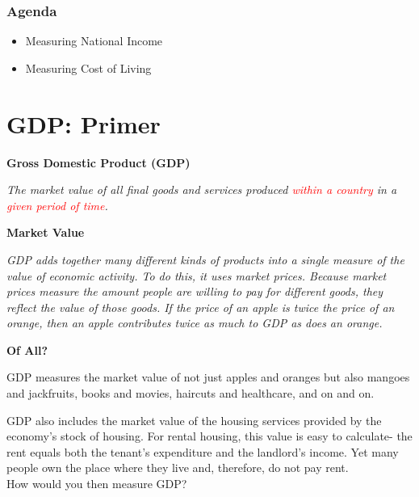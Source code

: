 \documentclass[shownotes,11pt, aspectratio=169]{beamer}
\begin{document}
\begin{frame}
\frametitle{Agenda}
\begin{itemize}
\item Measuring National Income
\item Measuring Cost of Living
\end{itemize}
\end{frame}

\section{GDP: Primer}
\begin{frame}
\textbf{Gross Domestic Product (GDP)} \\

\vspace{3mm}

\textit{The market value of all final goods and services produced \textcolor{red}{within a country} in a \textcolor{red}{given period of time}.}

\end{frame}

\begin{frame}
\textbf{Market Value} \\

\vspace{3mm}

\textit{GDP adds together many different kinds of products into a single measure of the value of economic activity. To do this, it uses market prices. Because market prices measure the amount people are willing to pay for
different goods, they reflect the value of those goods. If the price of an apple is twice the price of an orange, then an apple contributes twice as much to GDP as does an orange.}

\end{frame}

\begin{frame}
\textbf{Of All?} \\
\vspace{2mm}

GDP measures the market value of not just apples and oranges but also mangoes and jackfruits, books and movies, haircuts and healthcare, and on and on. \\
\vspace{2mm}

\pause

GDP also includes the market value of the housing services provided by the economy's stock of housing. For rental housing, this value is easy to calculate- the rent equals both the tenant's expenditure and the landlord's income. Yet many people own the place where they live and, therefore, do not pay rent.\\
How would you then measure GDP?

\end{frame}
\end{document}
